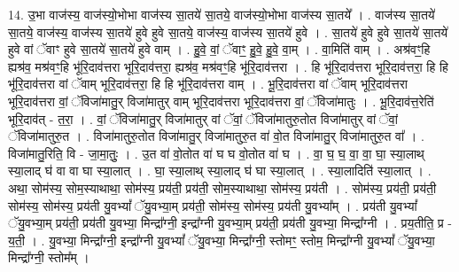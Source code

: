 \documentclass[17pt]{extarticle}
\begin{document}
14. उ॒भा वाज॑स्य॒ वाज॑स्यो॒भोभा वाज॑स्य सा॒तये॑ सा॒तये॒ वाज॑स्यो॒भोभा वाज॑स्य सा॒तये᳚ । . वाज॑स्य सा॒तये॑ सा॒तये॒ वाज॑स्य॒ वाज॑स्य सा॒तये॑ हुवे हुवे सा॒तये॒ वाज॑स्य॒ वाज॑स्य सा॒तये॑ हुवे । . सा॒तये॑ हुवे हुवे सा॒तये॑ सा॒तये॑ हुवे वां ॅवाꣳ हुवे सा॒तये॑ सा॒तये॑ हुवे वाम् । . हु॒वे॒ वां॒ ॅवाꣳ॒॒ हु॒वे॒ हु॒वे॒ वा॒म् । . वा॒मिति॑ वाम् । . अश्र॑वꣳ॒॒हि ह्यश्र॑व॒ मश्र॑वꣳ॒॒हि भू॑रि॒दाव॑त्तरा भूरि॒दाव॑त्तरा॒ ह्यश्र॑व॒ मश्र॑वꣳ॒॒हि भू॑रि॒दाव॑त्तरा । . हि भू॑रि॒दाव॑त्तरा भूरि॒दाव॑त्तरा॒ हि हि भू॑रि॒दाव॑त्तरा वां ॅवाम् भूरि॒दाव॑त्तरा॒ हि हि भू॑रि॒दाव॑त्तरा वाम् । . भू॒रि॒दाव॑त्तरा वां ॅवाम् भूरि॒दाव॑त्तरा भूरि॒दाव॑त्तरा वां॒ ॅविजा॑मातु॒र् विजा॑मातुर् वाम् भूरि॒दाव॑त्तरा भूरि॒दाव॑त्तरा वां॒ ॅविजा॑मातुः । . भू॒रि॒दाव॑त्त॒रेति॑ भूरि॒दाव॑त् - त॒रा॒ । . वां॒ ॅविजा॑मातु॒र् विजा॑मातुर् वां ॅवां॒ ॅविजा॑मातुरु॒तोत विजा॑मातुर् वां ॅवां॒ ॅविजा॑मातुरु॒त । . विजा॑मातुरु॒तोत विजा॑मातु॒र् विजा॑मातुरु॒त वा॑ वो॒त विजा॑मातु॒र् विजा॑मातुरु॒त वा᳚ । . विजा॑मातु॒रिति॒ वि - जा॒मा॒तुः॒ । . उ॒त वा॑ वो॒तोत वा॑ घ घ वो॒तोत वा॑ घ । . वा॒ घ॒ घ॒ वा॒ वा॒ घा॒ स्या॒लाथ् स्या॒लाद् घ॑ वा वा घा स्या॒लात् । . घा॒ स्या॒लाथ् स्या॒लाद् घ॑ घा स्या॒लात् । . स्या॒लादिति॑ स्या॒लात् । . अथा॒ सोम॑स्य॒ सोम॒स्याथाथा॒ सोम॑स्य॒ प्रय॑ती॒ प्रय॑ती॒ सोम॒स्याथाथा॒ सोम॑स्य॒ प्रय॑ती । . सोम॑स्य॒ प्रय॑ती॒ प्रय॑ती॒ सोम॑स्य॒ सोम॑स्य॒ प्रय॑ती यु॒वभ्यां᳚ ॅयु॒वभ्या॒म् प्रय॑ती॒ सोम॑स्य॒ सोम॑स्य॒ प्रय॑ती यु॒वभ्या᳚म् । . प्रय॑ती यु॒वभ्यां᳚ ॅयु॒वभ्या॒म् प्रय॑ती॒ प्रय॑ती यु॒वभ्या॒ मिन्द्रा᳚ग्नी॒ इन्द्रा᳚ग्नी यु॒वभ्या॒म् प्रय॑ती॒ प्रय॑ती यु॒वभ्या॒ मिन्द्रा᳚ग्नी । . प्रय॒तीति॒ प्र - य॒ती॒ । . यु॒वभ्या॒ मिन्द्रा᳚ग्नी॒ इन्द्रा᳚ग्नी यु॒वभ्यां᳚ ॅयु॒वभ्या॒ मिन्द्रा᳚ग्नी॒ स्तोमꣳ॒॒ स्तोम॒ मिन्द्रा᳚ग्नी यु॒वभ्यां᳚ ॅयु॒वभ्या॒ मिन्द्रा᳚ग्नी॒ स्तोम᳚म् । \newline
\end{document}
